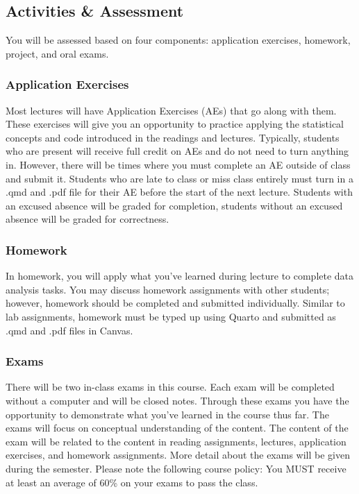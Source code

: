 \documentclass[
  letterpaper,
  DIV=11,
  numbers=noendperiod]{scrartcl}
\begin{document}
\subsection{Activities \& Assessment}\label{activities-assessment}

You will be assessed based on four components: application exercises,
homework, project, and oral exams.

\subsubsection{Application Exercises}\label{application-exercises}

Most lectures will have Application Exercises (AEs) that go along with
them. These exercises will give you an opportunity to practice applying
the statistical concepts and code introduced in the readings and
lectures. Typically, students who are present will receive full credit
on AEs and do not need to turn anything in. However, there will be times
where you must complete an AE outside of class and submit it. Students
who are late to class or miss class entirely must turn in a .qmd and
.pdf file for their AE before the start of the next lecture. Students
with an excused absence will be graded for completion, students without
an excused absence will be graded for correctness.

\subsubsection{Homework}\label{homework}

In homework, you will apply what you've learned during lecture to
complete data analysis tasks. You may discuss homework assignments with
other students; however, homework should be completed and submitted
individually. Similar to lab assignments, homework must be typed up
using Quarto and submitted as .qmd and .pdf files in Canvas.

\subsubsection{Exams}\label{exams}

There will be two in-class exams in this course. Each exam will be
completed without a computer and will be closed notes. Through these
exams you have the opportunity to demonstrate what you've learned in the
course thus far. The exams will focus on conceptual understanding of the
content. The content of the exam will be related to the content in
reading assignments, lectures, application exercises, and homework
assignments. More detail about the exams will be given during the
semester. Please note the following course policy: You MUST receive at
least an average of 60\% on your exams to pass the class.
\end{document}

